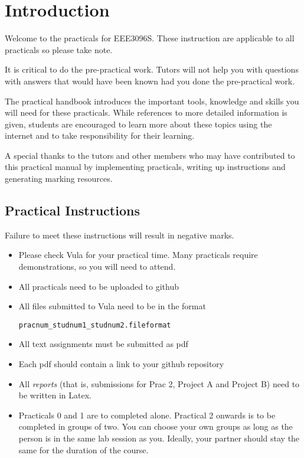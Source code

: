 \section*{Introduction}
Welcome to the practicals for EEE3096S. These instruction are applicable to all practicals so please take note.

It is critical to do the pre-practical work. Tutors will not help you with questions with answers that would have been known had you done the pre-practical work. 

The practical handbook introduces the important tools, knowledge and skills you will need for these practicals. While references to more detailed information is given, students are encouraged to learn more about these topics using the internet and to take responsibility for their learning.

A special thanks to the tutors and other members who may have contributed to this practical manual by implementing practicals, writing up instructions and generating marking resources. 


\subsection*{Practical Instructions}
Failure to meet these instructions will result in negative marks.
\begin{itemize}
    \item Please check Vula for your practical time. Many practicals require demonstrations, so you will need to attend.
    \item All practicals need to be uploaded to github
    \item All files submitted to Vula need to be in the format
    \begin{lstlisting}[gobble=4]
    pracnum_studnum1_studnum2.fileformat
    \end{lstlisting}
    \item All text assignments must be submitted as pdf
    \item Each pdf should contain a link to your github repository
    \item All \textit{reports} (that is, submissions for Prac 2, Project A and Project B) need to be written in Latex.
    \item Practicals 0 and 1 are to completed alone. Practical 2 onwards is to be completed in groups of two. You can choose your own groups as long as the person is in the same lab session as you. Ideally, your partner should stay the same for the duration of the course.
\end{itemize}